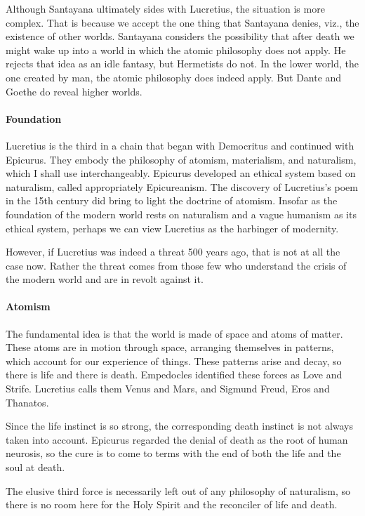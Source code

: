 Although Santayana ultimately sides with Lucretius, the situation is more complex. That is because we accept the one thing that Santayana denies, viz., the existence of other worlds. Santayana considers the possibility that after death we might wake up into a world in which the atomic philosophy does not apply. He rejects that idea as an idle fantasy, but Hermetists do not. In the lower world, the one created by man, the atomic philosophy does indeed apply. But Dante and Goethe do reveal higher worlds.

\paragraph{Foundation}
Lucretius is the third in a chain that began with Democritus and continued with Epicurus. They embody the philosophy of atomism, materialism, and naturalism, which I shall use interchangeably. Epicurus developed an ethical system based on naturalism, called appropriately Epicureanism. The discovery of Lucretius's poem in the 15th century did bring to light the doctrine of atomism. Insofar as the foundation of the modern world rests on naturalism and a vague humanism as its ethical system, perhaps we can view Lucretius as the harbinger of modernity.

However, if Lucretius was indeed a threat 500 years ago, that is not at all the case now. Rather the threat comes from those few who understand the crisis of the modern world and are in revolt against it.

\paragraph{Atomism}
The fundamental idea is that the world is made of space and atoms of matter. These atoms are in motion through space, arranging themselves in patterns, which account for our experience of things. These patterns arise and decay, so there is life and there is death. Empedocles identified these forces as Love and Strife. Lucretius calls them Venus and Mars, and Sigmund Freud, Eros and Thanatos.

Since the life instinct is so strong, the corresponding death instinct is not always taken into account. Epicurus regarded the denial of death as the root of human neurosis, so the cure is to come to terms with the end of both the life and the soul at death.

The elusive third force is necessarily left out of any philosophy of naturalism, so there is no room here for the Holy Spirit and the reconciler of life and death.


